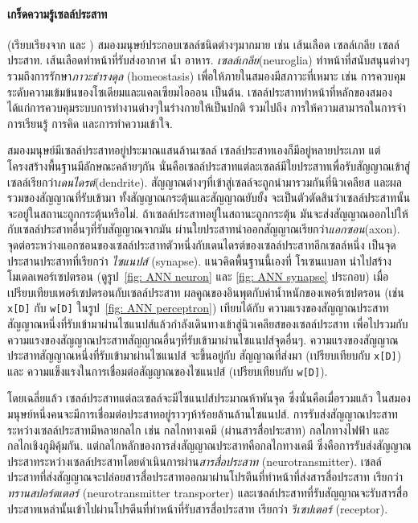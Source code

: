 {\small
\begin{shaded}
\paragraph{\small เกร็ดความรู้เซลล์ประสาท}
(เรียบเรียงจาก \cite{BuddhasBrain} และ \cite{Wikipedia})
สมองมนุษย์ประกอบเซลล์ชนิดต่างๆมากมาย
เช่น 
เส้นเลือด 
เซลล์เกลีย
เซลล์ประสาท.
เส้นเลือดทำหน้าที่รับส่งอากาศ น้ำ อาหาร.
\textit{เซลล์เกลีย}(neuroglia) ทำหน้าที่สนับสนุนต่างๆ รวมถึงการรักษา\textit{ภาวะธำรงดุล} (homeostasis) เพื่อให้ภายในสมองมีสภาวะที่เหมาะ เช่น การควบคุมระดับความเข้มข้นของโซเดียมและแคลเซียมไอออน เป็นต้น.
เซลล์ประสาททำหน้าที่หลักของสมอง ได้แก่การควบคุมระบบการทำงานต่างๆในร่างกายให้เป็นปกติ 
รวมไปถึง การให้ความสามารถในการจำ การเรียนรู้ การคิด และการทำความเข้าใจ.

สมองมนุษย์มีเซลล์ประสาทอยู่ประมาณแสนล้านเซลล์ 
เซลล์ประสาทเองก็มีอยู่หลายประเภท แต่โครงสร้างพื้นฐานมีลักษณะคล้ายๆกัน
%
นั่นคือเซลล์ประสาทแต่ละเซลล์มีใยประสาทเพื่อรับสัญญาณเข้าสู่เซลล์เรียกว่า\textit{เดนไดรต์}(dendrite).
สัญญาณต่างๆที่เข้าสู่เซลล์จะถูกนำมารวมกันที่นิวเคลียส
และผลรวมของสัญญาณที่รับเข้ามา ทั้งสัญญาณกระตุ้นและสัญญาณยับยั้ง 
จะเป็นตัวตัดสินว่าเซลล์ประสาทนั้นจะอยู่ในสถานะถูกกระตุ้นหรือไม่.
ถ้าเซลล์ประสาทอยู่ในสถานะถูกกระตุ้น มันจะส่งสัญญาณออกไปให้กับเซลล์ประสาทอื่นๆที่รับสัญญาณจากมัน
ผ่านใยประสาทนำออกสัญญาณเรียกว่า\textit{แอกซอน}(axon). 
จุดต่อระหว่างแอกซอนของเซลล์ประสาทตัวหนึ่งกับเดนไดรต์ของเซลล์ประสาทอีกเซลล์หนึ่ง 
เป็นจุดประสานประสาทที่เรียกว่า \textit{ไซแนปส์} (synapse).
แนวคิดพื้นฐานนี้เองที่ โรเซนแบลท นำไปสร้างโมเดลเพอร์เซปตรอน (ดูรูป~\ref{fig: ANN neuron} และ \ref{fig: ANN synapse} ประกอบ)
เมื่อเปรียบเทียบเพอร์เซปตรอนกับเซลล์ประสาท ผลคูณของอินพุตกับค่าน้ำหนักของเพอร์เซปตรอน (เช่น \verb|x[D]| กับ \verb|w[D]| ในรูป~\ref{fig: ANN perceptron}) เทียบได้กับ ความแรงของสัญญาณประสาทสัญญาณหนึ่งที่รับเข้ามาผ่านไซแนปส์แล้วกำลังเดินทางเข้าสู่นิวเคลียสของเซลล์ประสาท
เพื่อไปรวมกับความแรงของสัญญาณประสาทสัญญาณอื่นๆที่รับเข้ามาผ่านไซแนปส์จุดอื่นๆ.
ความแรงของสัญญาณประสาทสัญญาณหนึ่งที่รับเข้ามาผ่านไซแนปส์ จะขึ้นอยู่กับ
สัญญาณที่ส่งมา (เปรียบเทียบกับ \verb|x[D]|) และ ความแข็งแรงในการเชื่อมต่อสัญญาณของไซแนปส์ (เปรียบเทียบกับ \verb|w[D]|).

โดยเฉลี่ยแล้ว เซลล์ประสาทแต่ละเซลล์จะมีไซแนปส์ประมาณห้าพันจุด
ซึ่งนั่นคือเมื่อรวมแล้ว ในสมองมนุษย์หนึ่งคนจะมีการเชื่อมต่อประสาทอยู่ราวๆห้าร้อยล้านล้านไซแนปส์.
การรับส่งสัญญาณประสาทระหว่างเซลล์ประสาทมีหลายกลไก เช่น กลไกทางเคมี (ผ่านสารสื่อประสาท) กลไกทางไฟฟ้า และ กลไกเชิงภูมิคุ้มกัน.
แต่กลไกหลักของการส่งสัญญาณประสาทคือกลไกทางเคมี
ซึ่งคือการรับส่งสัญญาณประสาทระหว่างเซลล์ประสาทโดยดำเนินการผ่าน\textit{สารสื่อประสาท} (neurotransmitter). 
เซลล์ประสาทที่ส่งสัญญาณจะปล่อยสารสื่อประสาทออกมาผ่านโปรตีนที่ทำหน้าที่ส่งสารสื่อประสาท เรียกว่า \textit{ทรานสปอร์ตเตอร์} (neurotransmitter transporter) 
และเซลล์ประสาทที่รับสัญญาณจะรับสารสื่อประสาทเหล่านั้นเข้าไปผ่านโปรตีนที่ทำหน้าที่รับสารสื่อประสาท เรียกว่า \textit{รีเซปเตอร์} (receptor).



\end{shaded}}

